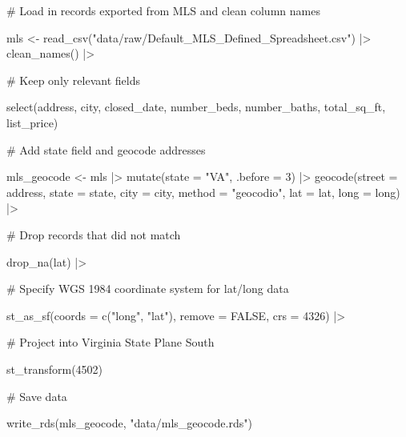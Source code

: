 \documentclass[
  letterpaper,
  DIV=11,
  numbers=noendperiod]{scrartcl}
\newenvironment{Shaded}{\begin{snugshade}}{\end{snugshade}}
\newcommand{\AttributeTok}[1]{\textcolor[rgb]{0.40,0.45,0.13}{#1}}
\newcommand{\CommentTok}[1]{\textcolor[rgb]{0.37,0.37,0.37}{#1}}
\newcommand{\ConstantTok}[1]{\textcolor[rgb]{0.56,0.35,0.01}{#1}}
\newcommand{\DecValTok}[1]{\textcolor[rgb]{0.68,0.00,0.00}{#1}}
\newcommand{\FunctionTok}[1]{\textcolor[rgb]{0.28,0.35,0.67}{#1}}
\newcommand{\NormalTok}[1]{\textcolor[rgb]{0.00,0.23,0.31}{#1}}
\newcommand{\OtherTok}[1]{\textcolor[rgb]{0.00,0.23,0.31}{#1}}
\newcommand{\SpecialCharTok}[1]{\textcolor[rgb]{0.37,0.37,0.37}{#1}}
\newcommand{\StringTok}[1]{\textcolor[rgb]{0.13,0.47,0.30}{#1}}
\begin{document}
\begin{Shaded}
\begin{Highlighting}[]
\CommentTok{\# Load in records exported from MLS and clean column names}

\NormalTok{mls }\OtherTok{\textless{}{-}} \FunctionTok{read\_csv}\NormalTok{(}\StringTok{"data/raw/Default\_MLS\_Defined\_Spreadsheet.csv"}\NormalTok{) }\SpecialCharTok{|\textgreater{}} 
  \FunctionTok{clean\_names}\NormalTok{() }\SpecialCharTok{|\textgreater{}} 
  
  \CommentTok{\# Keep only relevant fields}
  
  \FunctionTok{select}\NormalTok{(address, city, closed\_date, number\_beds, number\_baths, total\_sq\_ft, list\_price)}
  
\CommentTok{\# Add state field and geocode addresses}

\NormalTok{mls\_geocode }\OtherTok{\textless{}{-}}\NormalTok{ mls }\SpecialCharTok{|\textgreater{}} 
  \FunctionTok{mutate}\NormalTok{(}\AttributeTok{state =} \StringTok{"VA"}\NormalTok{, }\AttributeTok{.before =} \DecValTok{3}\NormalTok{) }\SpecialCharTok{|\textgreater{}} 
  \FunctionTok{geocode}\NormalTok{(}\AttributeTok{street =}\NormalTok{ address,}
          \AttributeTok{state =}\NormalTok{ state,}
          \AttributeTok{city =}\NormalTok{ city,}
          \AttributeTok{method =} \StringTok{"geocodio"}\NormalTok{,}
          \AttributeTok{lat =}\NormalTok{ lat,}
          \AttributeTok{long =}\NormalTok{ long) }\SpecialCharTok{|\textgreater{}} 
  
  \CommentTok{\# Drop records that did not match}
  
  \FunctionTok{drop\_na}\NormalTok{(lat) }\SpecialCharTok{|\textgreater{}} 
  
  \CommentTok{\# Specify WGS 1984 coordinate system for lat/long data}
  
  \FunctionTok{st\_as\_sf}\NormalTok{(}\AttributeTok{coords =} \FunctionTok{c}\NormalTok{(}\StringTok{"long"}\NormalTok{, }\StringTok{"lat"}\NormalTok{),}
           \AttributeTok{remove =} \ConstantTok{FALSE}\NormalTok{,}
           \AttributeTok{crs =} \DecValTok{4326}\NormalTok{) }\SpecialCharTok{|\textgreater{}} 
  
  \CommentTok{\# Project into Virginia State Plane South}
  
  \FunctionTok{st\_transform}\NormalTok{(}\DecValTok{4502}\NormalTok{)}

\CommentTok{\# Save data}

\FunctionTok{write\_rds}\NormalTok{(mls\_geocode, }\StringTok{"data/mls\_geocode.rds"}\NormalTok{)}
\end{Highlighting}
\end{Shaded}
\end{document}
